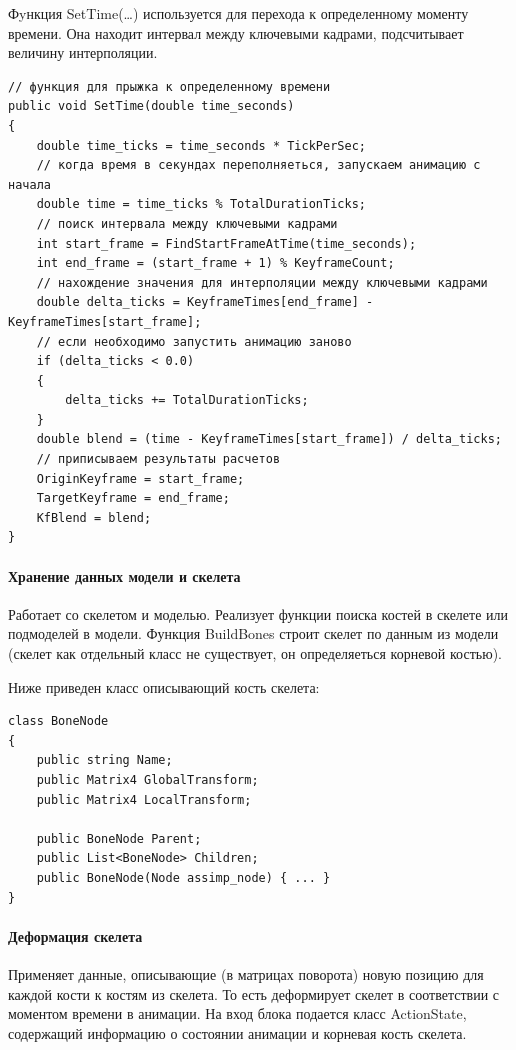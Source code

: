 Фyнкция SetTime(\dots) используется для перехода к определенному моменту времени. Она находит интервал между ключевыми кадрами, подсчитывает величину интерполяции.

\begin{verbatim}
// функция для прыжка к определенному времени
public void SetTime(double time_seconds)
{            
    double time_ticks = time_seconds * TickPerSec;
    // когда время в секундах переполняеться, запускаем анимацию с начала
    double time = time_ticks % TotalDurationTicks;
    // поиск интервала между ключевыми кадрами
    int start_frame = FindStartFrameAtTime(time_seconds);
    int end_frame = (start_frame + 1) % KeyframeCount;
    // нахождение значения для интерполяции между ключевыми кадрами
    double delta_ticks = KeyframeTimes[end_frame] - KeyframeTimes[start_frame];
    // если необходимо запустить анимацию заново
    if (delta_ticks < 0.0)
    {
        delta_ticks += TotalDurationTicks;
    }
    double blend = (time - KeyframeTimes[start_frame]) / delta_ticks;
    // приписываем результаты расчетов
    OriginKeyframe = start_frame;
    TargetKeyframe = end_frame;
    KfBlend = blend;
}
\end{verbatim}


\paragraph{Хранение данных модели и скелета}
Работает со скелетом и моделью.
Реализует функции поиска костей в скелете или подмоделей в модели.
Функция BuildBones строит скелет по данным из модели (скелет как отдельный класс не существует, он определяеться корневой костью).

Ниже приведен класс описывающий кость скелета:
\begin{verbatim}
class BoneNode
{
    public string Name;
    public Matrix4 GlobalTransform;
    public Matrix4 LocalTransform;

    public BoneNode Parent;
    public List<BoneNode> Children;
    public BoneNode(Node assimp_node) { ... }
}
\end{verbatim}


\paragraph{Деформация скелета}
Применяет данные, описывающие (в матрицах поворота) новую позицию для каждой кости к костям из скелета.
То есть деформирует скелет в соответствии с моментом времени в анимации. На вход блока подается класс ActionState, содержащий информацию о состоянии анимации и корневая кость скелета.

